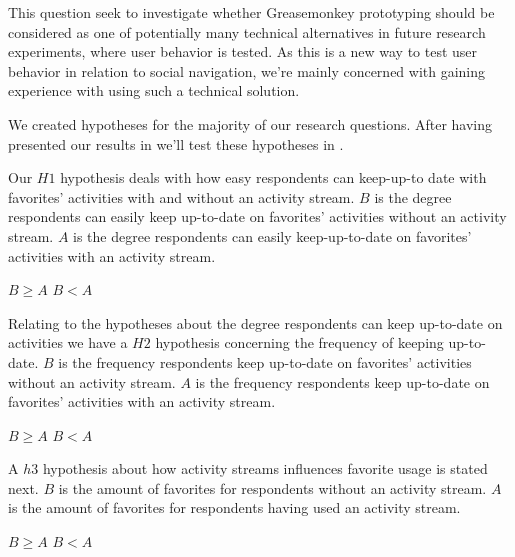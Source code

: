 This question seek to investigate whether Greasemonkey prototyping should be
considered as one of potentially many technical alternatives in future
research experiments, where user behavior is tested. As this is a new way
to test user behavior in relation to social navigation, we're mainly concerned
with gaining experience with using such a technical solution.

\parabreak

\addline

We created hypotheses for the majority of our research questions. After having
presented our results in 
 we'll test these hypotheses in
.

Our $H1$ hypothesis deals with how easy respondents can keep-up-to
date with favorites' activities with and without an 
activity stream.
$B$ is the degree respondents can easily keep up-to-date on
favorites' activities without an activity stream. $A$ is the degree
respondents can easily keep-up-to-date on favorites' activities  with
an activity stream.
\begin{items}
   $B \geq A$
   $B < A$
\end{items}

Relating to the hypotheses about the degree respondents can keep
up-to-date on activities we have a $H2$ hypothesis concerning
the frequency of keeping up-to-date.
$B$ is the frequency respondents keep up-to-date on favorites' activities
without an activity stream. $A$ is the frequency respondents keep
up-to-date on favorites' activities with an activity stream.
\begin{items}
   $B \geq A$
   $B < A$
\end{items}

A $h3$ hypothesis about how activity streams influences favorite usage is
stated next.
$B$ is the amount of favorites for respondents without an activity stream.
$A$ is the amount of favorites for respondents having used an activity
stream.
\begin{items}
   $B \geq A$
   $B < A$
\end{items}
